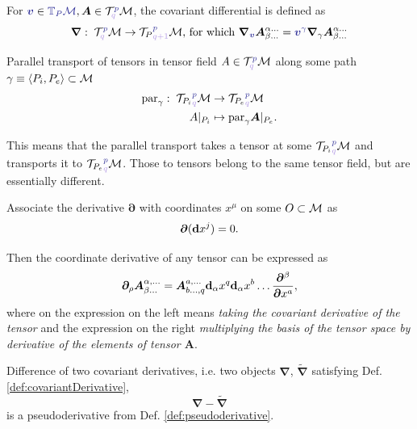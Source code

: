 \begin{definition}
    For $\bluee{\bm v} \in \bluee{\T_P\M}, \bm A\in \TT^{\bluee p}_{\blueee q} \M$, the covariant differential is defined as
    $$\bm\nabla:\; \TT^{\bluee p}_{\blueee q} \M \rightarrow {\TT_P}^{\bluee p}_{\blueee{q+1}} \M
    \text{, for which } \bm\nabla_{\bluee{\bm v}}\bm A^{\alpha\dots}_{\beta\dots}=\bluee{\bm v^\gamma} \bm\nabla_{\gamma}\bm A^{\alpha\dots}_{\beta\dots}$$
\end{definition}

\begin{definition}
    Parallel transport of tensors in tensor field $A\in \TT^{\bluee p}_{\blueee q} \M$ along some path $\gamma\equiv \langle P_i,P_e\rangle\subset \mathcal{M}$ 
    \begin{align*}
        \Par_\gamma:\; {\TT _{P_i}}^{\bluee p}_{\blueee q}\M&\rightarrow {\TT_{P_e}}^{\bluee p}_{\blueee q}\M\\
        A|_{P_i} &\mapsto \Par_\gamma \bm A|_{P_e}.
    \end{align*}
\end{definition}
This means that the parallel transport takes a tensor at some ${\TT_{P_i}}^{\bluee p}_{\blueee q} \M$ and transports it to ${\TT_{P_e}}^{\bluee p}_{\blueee q} \M$.  Those to tensors belong to the same tensor field, but are essentially different.

\begin{definition}
    Associate the derivative $\bm \partial$ with coordinates $x^\mu$ on some $O\subset\mathcal{M}$ as
    $$\bm \partial (\bm {\mathrm{d}} x^j)=0.$$
\end{definition}
Then the coordinate derivative of any tensor can be expressed as
\begin{equation}
    \bm \partial_\rho \bm A^{\alpha,\dots}_{\beta\dots} = \bm A^{a,\dots}_{b\dots,q}\bm {\mathrm{d}}_\alpha x^q \bm {\mathrm{d}}_\alpha x^b  \dots \frac{\bm \partial^\beta}{\bm \partial x^a},
\end{equation}
where on the expression on the left means \emph{taking the covariant derivative of the tensor} and the expression on the right \emph{multiplying the basis of the tensor space by derivative of the elements of tensor $\bm A$}.
\begin{thm}
     Difference of two covariant derivatives, i.e. two objects $\bm \nabla$, $\bm{\tilde\nabla}$ satisfying Def. \ref{def:covariantDerivative},
      $$\bm\nabla-\bm{\tilde\nabla}$$
    is a pseudoderivative from Def. \ref{def:pseudoderivative}.
\end{thm}

